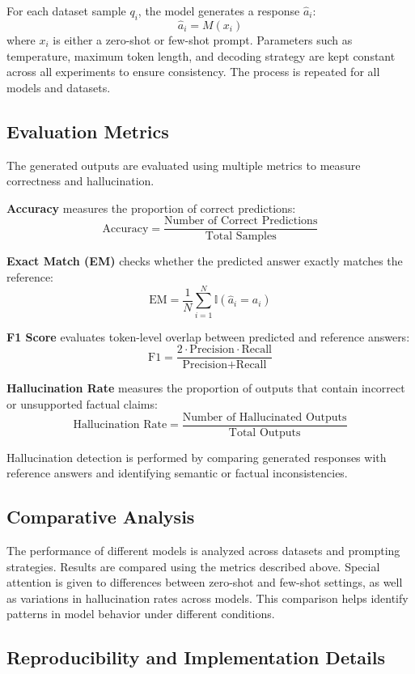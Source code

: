 \documentclass[sigconf,nonacm]{acmart}
\begin{document}
For each dataset sample $q_i$, the model generates a response $\hat{a}_i$:
\[
\hat{a}_i = M(x_i)
\]
where $x_i$ is either a zero-shot or few-shot prompt. Parameters such as temperature, maximum token length, and decoding strategy are kept constant across all experiments to ensure consistency. The process is repeated for all models and datasets.

\subsection{Evaluation Metrics}

The generated outputs are evaluated using multiple metrics to measure correctness and hallucination.

\textbf{Accuracy} measures the proportion of correct predictions:
\[
\text{Accuracy} = \frac{\text{Number of Correct Predictions}}{\text{Total Samples}}
\]

\textbf{Exact Match (EM)} checks whether the predicted answer exactly matches the reference:
\[
\text{EM} = \frac{1}{N} \sum_{i=1}^{N} \mathbb{I}(\hat{a}_i = a_i)
\]

\textbf{F1 Score} evaluates token-level overlap between predicted and reference answers:
\[
\text{F1} = \frac{2 \cdot \text{Precision} \cdot \text{Recall}}{\text{Precision} + \text{Recall}}
\]

\textbf{Hallucination Rate} measures the proportion of outputs that contain incorrect or unsupported factual claims:
\[
\text{Hallucination Rate} = \frac{\text{Number of Hallucinated Outputs}}{\text{Total Outputs}}
\]

Hallucination detection is performed by comparing generated responses with reference answers and identifying semantic or factual inconsistencies.

\subsection{Comparative Analysis}

The performance of different models is analyzed across datasets and prompting strategies. Results are compared using the metrics described above. Special attention is given to differences between zero-shot and few-shot settings, as well as variations in hallucination rates across models. This comparison helps identify patterns in model behavior under different conditions.

\subsection{Reproducibility and Implementation Details}
\end{document}

